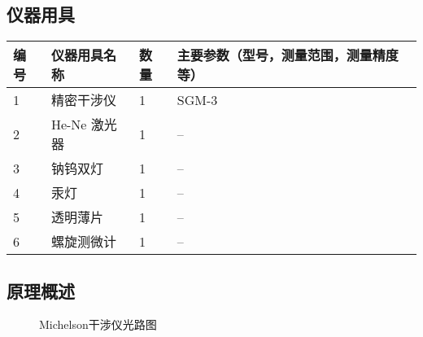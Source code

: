 \documentclass[dvipsnames, svgnames,a4paper,11pt]{article}
\begin{document}
	\subsection{仪器用具}
	\begin{table}[htbp]
		\centering
		\renewcommand\arraystretch{1.6}
		\begin{tabular}{p{}|p{}|p{}|p{}}
			\hline
			编号& 仪器用具名称 & 数量 &  主要参数（型号，测量范围，测量精度等） \\
			\hline
			1& 精密干涉仪 & 1 & SGM-3 \\
			\hline
			2& He-Ne 激光器 & 1 & -- \\
			\hline
			3& 钠钨双灯 & 1 & -- \\
			\hline
			4& 汞灯 & 1 & -- \\
			\hline
			5& 透明薄片 & 1 & -- \\
			\hline
			6& 螺旋测微计 & 1 & -- \\
			\hline
		\end{tabular}
	\end{table}
	
	\subsection{原理概述}
	
	\begin{figure}[htbp]
		\centering
		\caption{Michelson干涉仪光路图}
		\label{fig:figCB1}			
	\end{figure}
	
\end{document}

